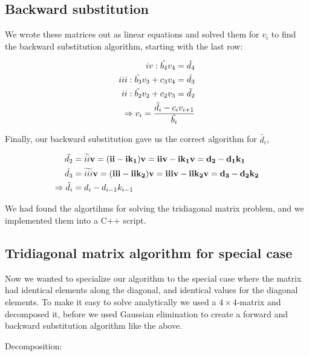 \documentclass[12pt]{article}
\newcommand{\RNum}[1]{\uppercase\expandafter{\romannumeral #1\relax}}
\begin{document}
\subsection{Backward substitution}

\noindent We wrote these matrices out as linear equations and solved them for $v_i$ to find the backward substitution algorithm, starting with the last row:

\begin{align*}
    \RNum{4}: \tilde{b_4}v_4 = \tilde{d_4} \\
    \RNum{3}: \tilde{b_3}v_3 + c_3 v_4 = \tilde{d_3} \\
    \RNum{2}: \tilde{b_2}v_2 + c_2 v_3 = \tilde{d_2} \\
    \Rightarrow v_i = \frac{\tilde{d_i} - c_i v_{i+1}}{\tilde{b_i}}\\
\end{align*}

\noindent Finally, our backward substitution gave us the correct algorithm for $\tilde{d_i}$,

\begin{align*}
    \tilde{d_2} &= \widetilde{\RNum{2}} \bf{v} = (\RNum{2} - \RNum{1}  k_1) \bf{v} = \RNum{2} \bf{v} - \RNum{1} k_1 \bf{v} = d_2 - d_1 k_1 \\
    \tilde{d_3} &= \widetilde{\RNum{3}} \bf{v} = (\RNum{3} - \RNum{2}  k_2) \bf{v} = \RNum{3} \bf{v} - \RNum{2} k_2 \bf{v} = d_3 - d_2 k_2 \\
    \Rightarrow \tilde{d_i} &= d_i - d_{i-1} k_{i-1}
\end{align*}

\noindent We had found the algortihms for solving the tridiagonal matrix problem, and we implemented them into a C++ script.


\subsection{Tridiagonal matrix algorithm for special case}

Now we wanted to specialize our algorithm to the special case where the matrix had identical elements along the diagonal, and identical values for the diagonal elements. To make it easy to solve analytically we used a $4 \times 4$-matrix and decomposed it, before we used Gaussian elimination to create a forward and backward substitution algorithm like the above.

\bigskip
\noindent Decomposition:
\end{document}
